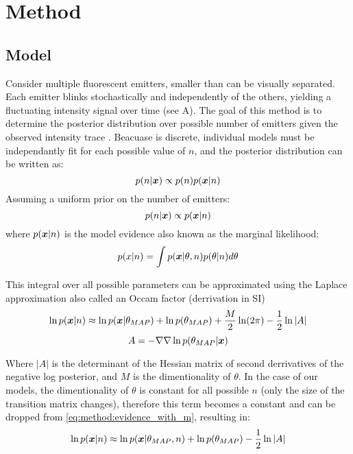 \section{Method}

\subsection{Model}
Consider multiple fluorescent emitters, smaller than can be visually separated.
%
Each emitter blinks stochastically and independently of the others, 
yielding a fluctuating intensity signal over time (see  A).
%
The goal of this method is to determine the posterior distribution over 
possible number of emitters \ndist given the observed intensity trace \trace.
%
Beacuase \ndist is discrete, individual models must be independantly fit 
for each possible value of $n$, and the posterior distribution can be written as:
% 
\begin{equation*}
  p(n | \bm{x}) \propto p(n) p(\bm{x} | n)
\end{equation*}
%
Assuming a uniform prior on the number of emitters:
\begin{equation*}
  p(n | \bm{x}) \propto p(\bm{x} | n)
\end{equation*}
%
where $p(\bm{x}|n)$ is the model evidence also known as the marginal likelihood:
\begin{equation*}
  p(x | n) = \int p(\bm{x} | \theta, n) p(\theta | n) d\theta
\end{equation*}

This integral over all possible parameters can be approximated using the 
Laplace approximation also called an Occam factor (derrivation in SI)
\begin{equation}
  \ln p(\bm{x} | n) \approx \ln p(\bm{x} | \theta_{MAP}) + \ln p(\theta_{MAP}) + \frac{M}{2} \ln(2\pi) - \frac{1}{2} \ln |A|
  \label{eq:method:evidence_with_m}
\end{equation}
\begin{equation*}
  A = -\nabla \nabla \ln p(\theta_{MAP} | \bm{x})
\end{equation*}

%
Where $|A|$ is the determinant of the Hessian matrix of second derrivatives 
of the negative log posterior, and $M$ is the dimentionality of $\theta$. 
%
In the case of our models, the dimentionality of $\theta$ is constant 
for all possible $n$ (only the size of the transition matrix changes),
therefore this term becomes a constant and can be dropped from 
\eqref{eq:method:evidence_with_m}, resulting in:
\begin{equation}
  \ln p(\bm{x} | n) \approx \ln p(\bm{x} | \theta_{MAP}, n) + \ln p(\theta_{MAP}) - \frac{1}{2} \ln |A|
  \label{eq:method:evidence}
\end{equation}

